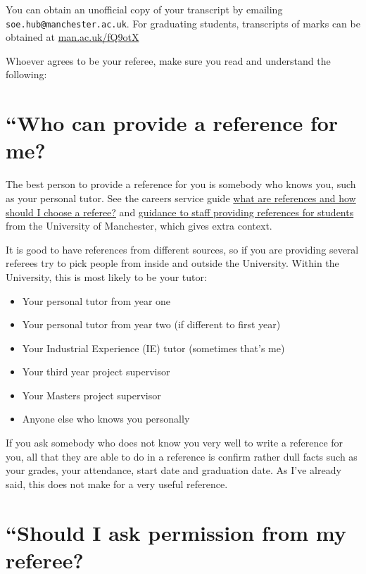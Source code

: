 \documentclass[
  12pt,
]{book}
\providecommand{\tightlist}{%
  \setlength{\itemsep}{0pt}\setlength{\parskip}{0pt}}
\begin{document}
You can obtain an unofficial copy of your transcript by emailing \texttt{soe.hub@manchester.ac.uk}. For graduating students, transcripts of marks can be obtained at \href{http://man.ac.uk/fQ9otX}{man.ac.uk/fQ9otX}

Whoever agrees to be your referee, make sure you read and understand the following:

\hypertarget{who}{%
\section{``Who can provide a reference for me?}\label{who}}

The best person to provide a reference for you is somebody who knows you, such as your personal tutor. See the careers service guide \href{http://www.careers.manchester.ac.uk/applicationsinterviews/faqs/references}{what are references and how should I choose a referee?} and \href{http://documents.manchester.ac.uk/display.aspx?DocID=1921}{guidance to staff providing references for students} from the University of Manchester, which gives extra context.

It is good to have references from different sources, so if you are providing several referees try to pick people from inside and outside the University. Within the University, this is most likely to be your tutor:

\begin{itemize}
\tightlist
\item
  Your personal tutor from year one
\item
  Your personal tutor from year two (if different to first year)
\item
  Your Industrial Experience (IE) tutor (sometimes that's me)
\item
  Your third year project supervisor
\item
  Your Masters project supervisor
\item
  Anyone else who knows you personally
\end{itemize}

If you ask somebody who does not know you very well to write a reference for you, all that they are able to do in a reference is confirm rather dull facts such as your grades, your attendance, start date and graduation date. As I've already said, this does not make for a very useful reference.

\hypertarget{permission}{%
\section{``Should I ask permission from my referee?}\label{permission}}
\end{document}
